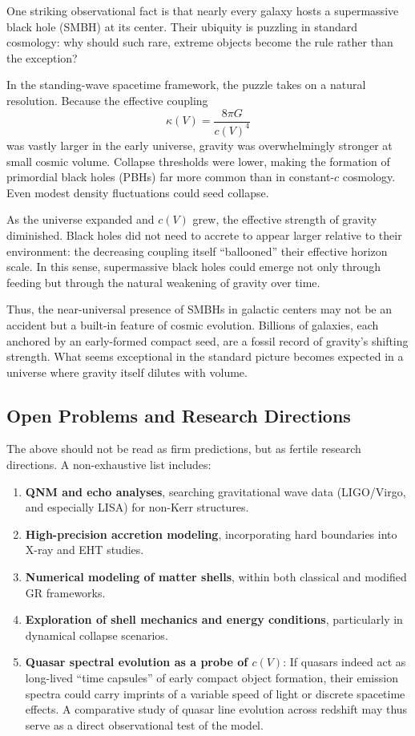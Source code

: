 \documentclass[12pt]{article}
\begin{document}
One striking observational fact is that nearly every galaxy hosts a supermassive black hole (SMBH) at its center. Their ubiquity is puzzling in standard cosmology: why should such rare, extreme objects become the rule rather than the exception?

In the standing-wave spacetime framework, the puzzle takes on a natural resolution. Because the effective coupling 
\[
\kappa(V) = \frac{8\pi G}{c(V)^4}
\]
was vastly larger in the early universe, gravity was overwhelmingly stronger at small cosmic volume. Collapse thresholds were lower, making the formation of primordial black holes (PBHs) far more common than in constant-$c$ cosmology. Even modest density fluctuations could seed collapse.

As the universe expanded and $c(V)$ grew, the effective strength of gravity diminished. Black holes did not need to accrete to appear larger relative to their environment: the decreasing coupling itself ``ballooned'' their effective horizon scale. In this sense, supermassive black holes could emerge not only through feeding but through the natural weakening of gravity over time.

Thus, the near-universal presence of SMBHs in galactic centers may not be an accident but a built-in feature of cosmic evolution. Billions of galaxies, each anchored by an early-formed compact seed, are a fossil record of gravity’s shifting strength. What seems exceptional in the standard picture becomes expected in a universe where gravity itself dilutes with volume.

\subsection{Open Problems and Research Directions}

The above should not be read as firm predictions, but as fertile research directions. A non-exhaustive list includes:

\begin{enumerate}
    \item \textbf{QNM and echo analyses}, searching gravitational wave data (LIGO/Virgo, and especially LISA) for non-Kerr structures.
    \item \textbf{High-precision accretion modeling}, incorporating hard boundaries into X-ray and EHT studies.
    \item \textbf{Numerical modeling of matter shells}, within both classical and modified GR frameworks.
    \item \textbf{Exploration of shell mechanics and energy conditions}, particularly in dynamical collapse scenarios.
    \item \textbf{Quasar spectral evolution as a probe of $c(V)$}: 
    If quasars indeed act as long-lived ``time capsules'' of early compact object formation, their emission spectra could carry imprints of a variable speed of light or discrete spacetime effects. 
    A comparative study of quasar line evolution across redshift may thus serve as a direct observational test of the model.
\end{enumerate}
\end{document}
